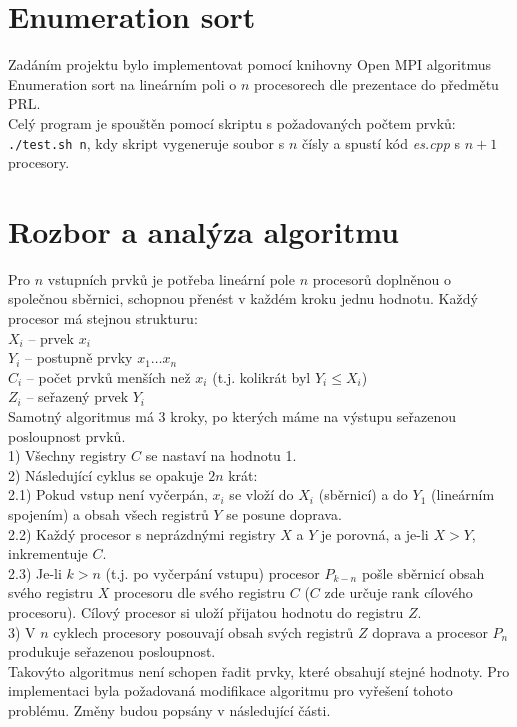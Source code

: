 \documentclass[11pt]{article}
\begin{document}
\section{Enumeration sort}
Zadáním projektu bylo implementovat pomocí knihovny Open MPI algoritmus Enumeration sort na lineárním poli o $n$ procesorech dle prezentace do předmětu PRL.\\
Celý program je spouštěn pomocí skriptu s požadovaných počtem prvků: \texttt{./test.sh n}, 
kdy skript vygeneruje soubor s $n$ čísly a spustí kód \textit{es.cpp} s $n+1$ procesory.

\section{Rozbor a analýza algoritmu}
Pro $n$ vstupních prvků je potřeba lineární pole $n$ procesorů doplněnou o společnou sběrnici, schopnou přenést v každém kroku jednu hodnotu.
Každý procesor má stejnou strukturu:\\
$X_i$ -- prvek $x_i$ \\
$Y_i$ -- postupně prvky $x_{1} \dots x_{n}$ \\
$C_i$ -- počet prvků menších než $x_i$ (t.j. kolikrát byl $Y_i \leq X_i$) \\
$Z_i$ -- seřazený prvek $Y_i $\\
Samotný algoritmus má 3 kroky, po kterých máme na výstupu seřazenou posloupnost prvků.\\
1) Všechny registry $C$ se nastaví na hodnotu 1. \\
2) Následující cyklus se opakuje $2n$ krát: \\
2.1) Pokud vstup není vyčerpán, $x_i$ se vloží do $X_i$ (sběrnicí) a do $Y_1$ (lineárním spojením) a obsah všech registrů $Y$ se posune doprava.\\
2.2) Každý procesor s neprázdnými registry $X$ a $Y$ je porovná, a je-li $X > Y$, inkrementuje $C$.\\
2.3) Je-li $k > n$ (t.j. po vyčerpání vstupu) procesor $P_{k-n}$ pošle sběrnicí obsah svého registru $X$ procesoru dle svého registru $C$ ($C$ zde určuje rank cílového procesoru). Cílový procesor si uloží přijatou hodnotu do registru $Z$.\\
3) V $n$ cyklech procesory posouvají obsah svých registrů $Z$ doprava a procesor $P_n$ produkuje seřazenou posloupnost.\\
Takovýto algoritmus není schopen řadit prvky, které obsahují stejné hodnoty. Pro implementaci byla požadovaná modifikace algoritmu pro vyřešení tohoto problému. Změny budou popsány v následující části.\\
\end{document}
